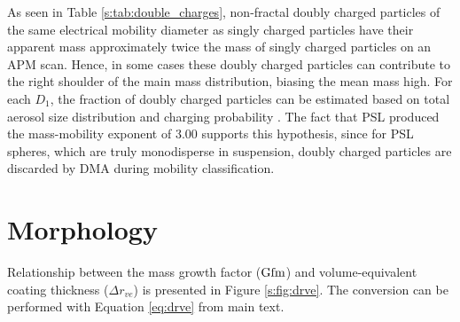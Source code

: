 \documentclass[12pt]{article}
\begin{document}
\noindent As seen in Table \ref{s:tab:double_charges}, non-fractal doubly charged particles of the same electrical mobility diameter as singly charged particles have their apparent mass approximately twice the mass of singly charged particles on an APM scan. Hence, in some cases these doubly charged particles can contribute to the right shoulder of the main mass distribution, biasing the mean mass high. For each $D_1$, the fraction of doubly charged particles can be estimated based on total aerosol size distribution and charging probability \citep{RN10}. The fact that PSL produced the mass-mobility exponent of 3.00 supports this hypothesis, since for PSL spheres, which are truly monodisperse in suspension, doubly charged particles are discarded by DMA during mobility classification. 



\section{Morphology}


Relationship between the mass growth factor ($\rm Gfm$) and volume-equivalent coating thickness ($\Delta r_{ve}$) is presented in Figure \ref{s:fig:drve}. The conversion can be performed with Equation \ref{eq:drve} from main text.
\end{document}
